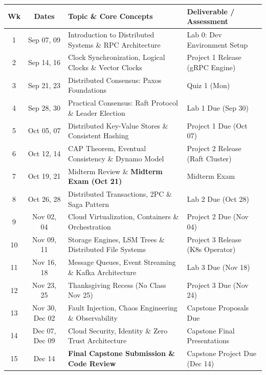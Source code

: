 \documentclass[11pt, a4paper]{article}
\begin{document}
\small
\noindent
\begin{tabularx}{\textwidth}{c c X l}
  \arrayrulecolor{NavyPrimary}
  \toprule
  \rowcolor{NavyPrimary!15}
  \textbf{Wk} & \textbf{Dates} & \textbf{Topic \& Core Concepts} & \textbf{Deliverable / Assessment} \\
  \midrule
  1 & Sep 07, 09 & Introduction to Distributed Systems \& RPC Architecture & Lab 0: Dev Environment Setup \\{}
  2 & Sep 14, 16 & Clock Synchronization, Logical Clocks \& Vector Clocks & Project 1 Release (gRPC Engine) \\{}
  3 & Sep 21, 23 & Distributed Consensus: Paxos Foundations & Quiz 1 (Mon) \\{}
  4 & Sep 28, 30 & Practical Consensus: Raft Protocol \& Leader Election & Lab 1 Due (Sep 30) \\{}
  5 & Oct 05, 07 & Distributed Key-Value Stores \& Consistent Hashing & Project 1 Due (Oct 07) \\{}
  6 & Oct 12, 14 & CAP Theorem, Eventual Consistency \& Dynamo Model & Project 2 Release (Raft Cluster) \\{}
  7 & Oct 19, 21 & Midterm Review \& \textbf{Midterm Exam (Oct 21)} & Midterm Exam \\{}
  8 & Oct 26, 28 & Distributed Transactions, 2PC \& Saga Pattern & Lab 2 Due (Oct 28) \\{}
  9 & Nov 02, 04 & Cloud Virtualization, Containers \& Orchestration & Project 2 Due (Nov 04) \\{}
  10 & Nov 09, 11 & Storage Engines, LSM Trees \& Distributed File Systems & Project 3 Release (K8s Operator) \\{}
  11 & Nov 16, 18 & Message Queues, Event Streaming \& Kafka Architecture & Lab 3 Due (Nov 18) \\{}
  12 & Nov 23, 25 & Thanksgiving Recess (No Class Nov 25) & Project 3 Due (Nov 24) \\{}
  13 & Nov 30, Dec 02 & Fault Injection, Chaos Engineering \& Observability & Capstone Proposals Due \\{}
  14 & Dec 07, Dec 09 & Cloud Security, Identity \& Zero Trust Architecture & Capstone Final Presentations \\{}
  15 & Dec 14 & \textbf{Final Capstone Submission \& Code Review} & Capstone Project Due (Dec 14) \\
  \bottomrule
\end{tabularx}
\end{document}
